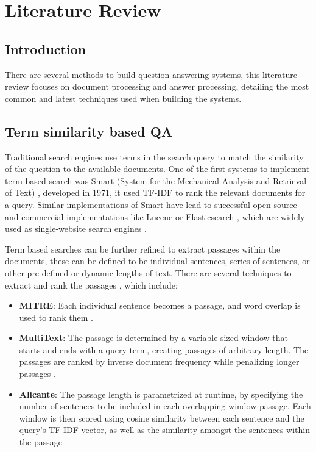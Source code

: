 \chapter{Literature Review}


\label{chapter:literature_review}


\section{Introduction}
There are several methods to build question answering systems, this literature review focuses on document processing and answer processing, detailing the most common and latest techniques used when building the systems.

\section{Term similarity based QA}
Traditional search engines use terms in the search query to match the similarity of the question to the available documents. One of the first systems to implement term based search was Smart (System for the Mechanical Analysis and Retrieval of Text) \cite{10.5555/1102022}, developed in 1971, it used TF-IDF to rank the relevant documents for a query. Similar implementations of Smart have lead to successful open-source and commercial implementations like Lucene \cite{bialecki2012apache} or Elasticsearch \cite{elasticsearch2018elasticsearch}, which are widely used as single-website search engines \cite{andrews2005magic}. 

Term based searches can be further refined to extract passages within the documents, these can be defined to be individual sentences, series of sentences, or other pre-defined or dynamic lengths of text. There are several techniques to extract and rank the passages \cite{tellex2003quantitative}, which include: 
\begin{itemize}
	\item \textbf{MITRE}: Each individual sentence becomes a passage, and word overlap is used to rank them \cite{light2001analyses}.
	\item \textbf{MultiText}: The passage is determined by a variable sized window that starts and ends with a query term, creating passages of arbitrary length. The passages are ranked by inverse document frequency while penalizing longer passages \cite{clarke2000question}.
	\item \textbf{Alicante}: The passage length is parametrized at runtime, by specifying the number of sentences to be included in each overlapping window passage. Each window is then scored using cosine similarity between each sentence and the query's TF-IDF vector, as well as the similarity amongst the sentences within the passage \cite{vicedo2002university}.
\end{itemize}

